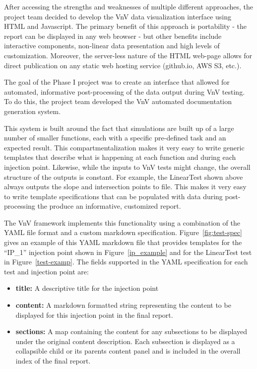 After accessing the strengths and weaknesses of multiple different approaches, the project team decided to develop the VnV data visualization interface using HTML and Javascript. The primary benefit of this approach is portability - the report can be displayed in any web browser - but other benefits include interactive components, non-linear data presentation and high levels of customization. Moreover, the server-less nature of the HTML web-page allows for direct publication on any static web hosting service (github.io, AWS S3, etc.). 

The goal of the Phase I project was to create an interface that allowed for automated, informative post-processing of the data output during VnV testing. To do this, the project team developed the VnV automated documentation generation system. 

This system is built around the fact that simulations are built up of a large number of smaller functions, each with a specific pre-defined task and an expected result. This compartmentalization makes it very easy to write generic templates that describe what is happening at each function and during each injection point. Likewise, while the inputs to VnV tests might change, the overall structure of the outputs is constant. For example, the LinearTest shown above always outputs the slope and intersection points to file. This makes it very easy to write template specifications that can be populated with data during post-processing the produce an informative, customized report. 

The VnV framework implements this functionality using a combination of the YAML file format and a custom markdown specification. Figure~\ref{fig:test-spec} gives an example of this YAML
markdown file that provides templates for the ``IP\_1'' injection point shown in Figure~\ref{ip_example} and for the LinearTest test in Figure~\ref{test-examp}. The fields supported in the YAML specification for each test and injection point are:

\begin{itemize}
 \item {\bf title:} A descriptive title for the injection point 
 \item {\bf content:} A markdown formatted string representing the content to be displayed for this injection point in the final report.
 \item {\bf sections:} A map containing the content for any subsections to be displayed under the original content description. Each subsection is displayed  as a collapsible child or its parents content panel and is included in the overall index of the final report. 
 \end{itemize}

